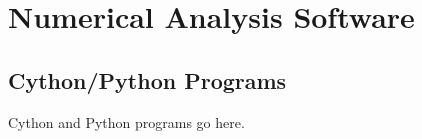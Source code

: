 \chapter{Numerical Analysis Software}
\label{cha:numerical}

\minitoc
\vspace{10mm}

\section{Cython/Python Programs}
Cython and Python programs go here.

